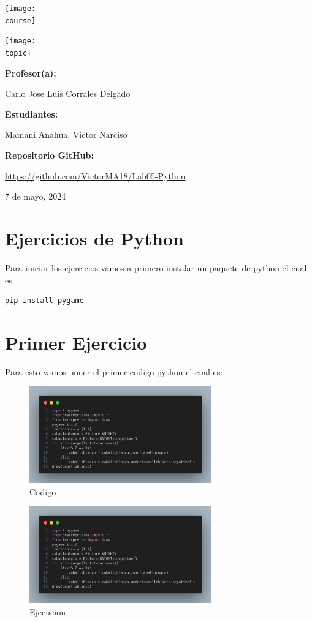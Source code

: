 \documentclass[10pt, a4paper]{article}
\newcommand{\course}{img/web_programming}
\newcommand{\topic}{img/Python.png}
\newcommand{\professor}{Carlo Jose Luis Corrales Delgado}
\newcommand{\students}{Mamani Anahua, Victor Narciso}
\newcommand{\github}{https://github.com/VictorMA18/Lab05-Python}
\newcommand{\mydate}{7 de mayo, 2024}
\begin{document}
\begin{titlepage}
	\centering
	\texttt{[image: \\course]} \par
  \vfill \vfill
	\texttt{[image: \\topic]}\par
  \vfill \vfill
  {\textbf{Profesor(a):} \par}
	\professor \vfill
  {\textbf{Estudiantes:} \par}
	\students \vfill
  {\textbf{Repositorio GitHub:} \par}
  \href{\github}{\github} \vfill
	{\large \mydate \par}
\end{titlepage}

\section{Ejercicios de Python}
Para iniciar los ejercicios vamos a primero instalar un paquete de python el cual es 
\begin{lstlisting}[language=bash]
  pip install pygame
\end{lstlisting} 

\section{Primer Ejercicio}
Para esto vamos poner el primer codigo python el cual es:  
\begin{figure}[H]
  \centering
  \includegraphics[width=0.7\textwidth]{img/Ej1.png}
  \caption{Codigo}
\end{figure}

\begin{figure}[H]
  \centering
  \includegraphics[width=0.7\textwidth]{img/Ej1.png}
  \caption{Ejecucion}
\end{figure}
\end{document}
